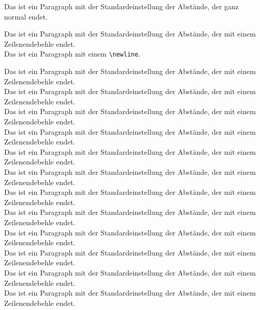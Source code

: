 \documentclass[a5paper]{article}
\begin{document}
Das ist ein Paragraph mit der Standardeinstellung der Abstände, der ganz normal endet.

Das ist ein Paragraph mit der Standardeinstellung der Abstände, der mit einem Zeilenendebehle endet.\\

Das ist ein Paragraph mit einem \texttt{\textbackslash newline}.\newline





Das ist ein Paragraph mit der Standardeinstellung der Abstände, der mit einem Zeilenendebehle endet.\\

Das ist ein Paragraph mit der Standardeinstellung der Abstände, der mit einem Zeilenendebehle endet.\\

Das ist ein Paragraph mit der Standardeinstellung der Abstände, der mit einem Zeilenendebehle endet.\\

Das ist ein Paragraph mit der Standardeinstellung der Abstände, der mit einem Zeilenendebehle endet.\\

Das ist ein Paragraph mit der Standardeinstellung der Abstände, der mit einem Zeilenendebehle endet.\\

Das ist ein Paragraph mit der Standardeinstellung der Abstände, der mit einem Zeilenendebehle endet.\\

Das ist ein Paragraph mit der Standardeinstellung der Abstände, der mit einem Zeilenendebehle endet.\\

Das ist ein Paragraph mit der Standardeinstellung der Abstände, der mit einem Zeilenendebehle endet.\\

Das ist ein Paragraph mit der Standardeinstellung der Abstände, der mit einem Zeilenendebehle endet.\\

Das ist ein Paragraph mit der Standardeinstellung der Abstände, der mit einem Zeilenendebehle endet.\\

Das ist ein Paragraph mit der Standardeinstellung der Abstände, der mit einem Zeilenendebehle endet.\\

Das ist ein Paragraph mit der Standardeinstellung der Abstände, der mit einem Zeilenendebehle endet.\\
\end{document}
